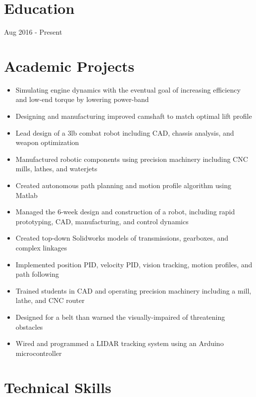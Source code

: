 \documentclass{resume}
\begin{document}
\section{Education}
\begin{schools}{Aug 2016 - Present}

  
\end{schools}
  \section{Academic Projects}\begin{itemize}
\item Simulating engine dynamics with the eventual goal of increasing efficiency and low-end torque by lowering power-band
\item Designing and manufacturing improved camshaft to match optimal lift profile\end{itemize}\begin{itemize}
\item Lead design of a 3lb combat robot including CAD, chassis analysis, and weapon optimization
\item Manufactured robotic components using precision machinery including CNC mills, lathes, and waterjets
\item Created autonomous path planning and motion profile algorithm using Matlab\end{itemize}\begin{itemize}
\item Managed the 6-week design and construction of a robot, including rapid prototyping, CAD, manufacturing, and control dynamics
\item Created top-down Solidworks models of transmissions, gearboxes, and complex linkages
\item Implemented position PID, velocity PID, vision tracking, motion profiles, and path following
\item Trained students in CAD and operating precision machinery including a mill, lathe, and CNC router\end{itemize}\begin{itemize}
\item Designed for a belt than warned the visually-impaired of threatening obstacles
\item Wired and programmed a LIDAR tracking system using an Arduino microcontroller\end{itemize}\section{Technical Skills}
\end{document}
